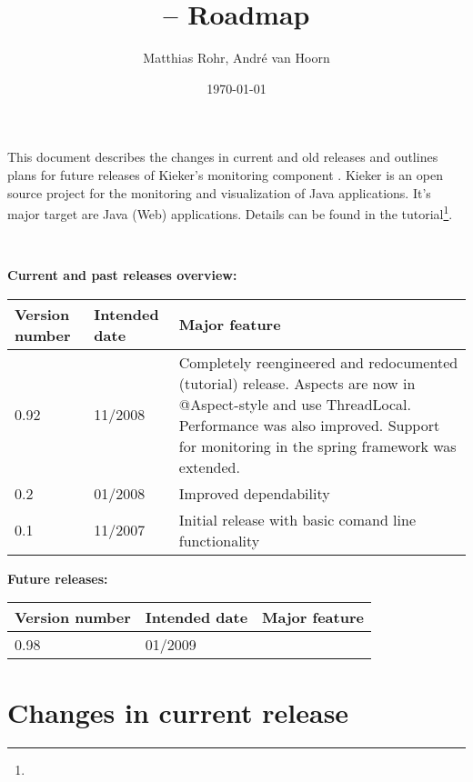 \documentclass{scrartcl}
\title{\kieker -- Roadmap}
\date{\today \\ \kiekerurl{roadmap.pdf}}
\author{Matthias Rohr, Andr\'{e} van Hoorn}
\begin{document}
\maketitle
\noindent
This document describes the changes in current and old releases and outlines plans for future releases of Kieker's monitoring component \tpmon{}. Kieker is an open source project
for the monitoring and visualization of Java applications. It's major target are Java (Web) applications. Details can be found in the tutorial\footnote{\kiekertutorialurl}.

\

\noindent \large{\textbf{Current and past releases overview:}} 
\begin{center}%
 \begin{tabular}{|l|l|p{8cm}|} \hline 
\textbf{Version number} & \textbf{Intended date} & \textbf{Major feature} \\ \hline 
0.92 & 11/2008 & Completely reengineered and redocumented (tutorial) release. Aspects are now in @Aspect-style and use ThreadLocal. Performance was also improved. Support for monitoring in the spring framework was extended.\\ \hline
0.2 & 01/2008 & Improved dependability \\ \hline 
0.1 & 11/2007 & Initial release with basic comand line functionality \\ \hline 
\end{tabular}
\end{center}

\noindent \large{\textbf{Future releases:}} 
\begin{center}%
 \begin{tabular}{|l|l|p{8cm}|} \hline 
\textbf{Version number} & \textbf{Intended date} & \textbf{Major feature} \\ \hline 
0.98 & 01/2009 & \\ \hline
\end{tabular}
\end{center}



\section{Changes in current release}
\end{document}
